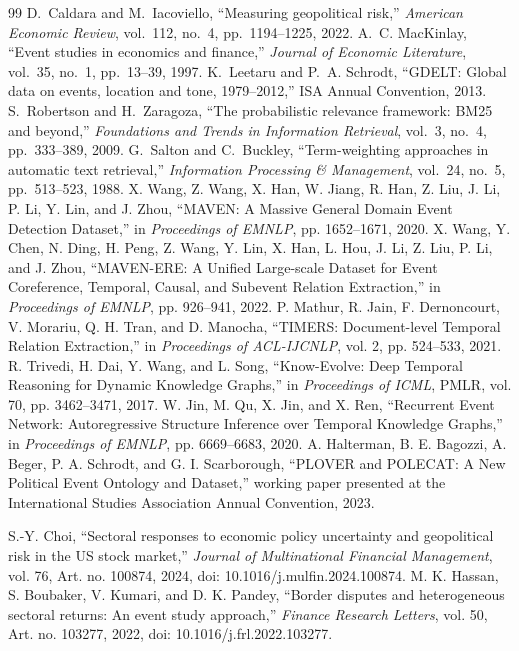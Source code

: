 \documentclass[10pt,a4paper,twocolumn]{article}
\begin{document}
\begin{thebibliography}{99}
 D.~Caldara and M.~Iacoviello, ``Measuring geopolitical risk,'' \emph{American Economic Review}, vol.~112, no.~4, pp.~1194--1225, 2022.
 A.~C. MacKinlay, ``Event studies in economics and finance,'' \emph{Journal of Economic Literature}, vol.~35, no.~1, pp.~13--39, 1997.
 K.~Leetaru and P.~A. Schrodt, ``GDELT: Global data on events, location and tone, 1979--2012,'' ISA Annual Convention, 2013.
 S.~Robertson and H.~Zaragoza, ``The probabilistic relevance framework: BM25 and beyond,'' \emph{Foundations and Trends in Information Retrieval}, vol.~3, no.~4, pp.~333--389, 2009.
 G.~Salton and C.~Buckley, ``Term-weighting approaches in automatic text retrieval,'' \emph{Information Processing \& Management}, vol.~24, no.~5, pp.~513--523, 1988.
 X. Wang, Z. Wang, X. Han, W. Jiang, R. Han, Z. Liu, J. Li, P. Li, Y. Lin, and J. Zhou, ``MAVEN: A Massive General Domain Event Detection Dataset,'' in \emph{Proceedings of EMNLP}, pp. 1652--1671, 2020.
 X. Wang, Y. Chen, N. Ding, H. Peng, Z. Wang, Y. Lin, X. Han, L. Hou, J. Li, Z. Liu, P. Li, and J. Zhou, ``MAVEN-ERE: A Unified Large-scale Dataset for Event Coreference, Temporal, Causal, and Subevent Relation Extraction,'' in \emph{Proceedings of EMNLP}, pp. 926--941, 2022.
 P. Mathur, R. Jain, F. Dernoncourt, V. Morariu, Q. H. Tran, and D. Manocha, ``TIMERS: Document-level Temporal Relation Extraction,'' in \emph{Proceedings of ACL-IJCNLP}, vol. 2, pp. 524--533, 2021.
 R. Trivedi, H. Dai, Y. Wang, and L. Song, ``Know-Evolve: Deep Temporal Reasoning for Dynamic Knowledge Graphs,'' in \emph{Proceedings of ICML}, PMLR, vol. 70, pp. 3462--3471, 2017.
 W. Jin, M. Qu, X. Jin, and X. Ren, ``Recurrent Event Network: Autoregressive Structure Inference over Temporal Knowledge Graphs,'' in \emph{Proceedings of EMNLP}, pp. 6669--6683, 2020.
 A. Halterman, B. E. Bagozzi, A. Beger, P. A. Schrodt, and G. I. Scarborough, ``PLOVER and POLECAT: A New Political Event Ontology and Dataset,'' working paper presented at the International Studies Association Annual Convention, 2023.

 S.-Y. Choi, ``Sectoral responses to economic policy uncertainty and geopolitical risk in the US stock market,'' \emph{Journal of Multinational Financial Management}, vol. 76, Art. no. 100874, 2024, doi: 10.1016/j.mulfin.2024.100874.
 M. K. Hassan, S. Boubaker, V. Kumari, and D. K. Pandey, ``Border disputes and heterogeneous sectoral returns: An event study approach,'' \emph{Finance Research Letters}, vol. 50, Art. no. 103277, 2022, doi: 10.1016/j.frl.2022.103277.
\end{thebibliography}
\end{document}

